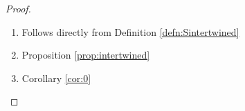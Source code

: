 \documentclass[pdflatex,sn-mathphys-num]{sn-jnl}
\newcommand{\Junbang}[1]{{\color{magenta}#1}}
\theoremstyle{definition}
\newtheorem{ex}[theorem]{Example}
\newtheorem*{remark}{Remark}
\begin{document}
\begin{proof}

\begin{enumerate}
  \item Follows directly from Definition \ref{defn:Sintertwined}
  \item Proposition \ref{prop:intertwined}
  \item Corollary \ref{cor:0}
 \end{enumerate}
\end{proof}

\end{document}
